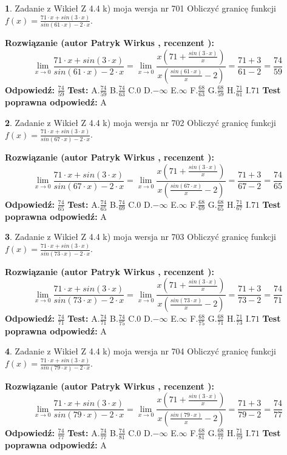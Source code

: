\documentclass[12pt, a4paper]{article}
\theoremstyle{definition} %
\newtheorem{zad}{}
\newcommand{\zadStart}[1]{\begin{zad}#1\newline}
\newcommand{\zadStop}{\end{zad}}
\newcommand{\rozwStart}[2]{\noindent \textbf{Rozwiązanie (autor #1 , recenzent #2): }\newline}
\newcommand{\rozwStop}{\newline}
\newcommand{\odpStart}{\noindent \textbf{Odpowiedź:}\newline}
\newcommand{\odpStop}{\newline}
\newcommand{\testStart}{\noindent \textbf{Test:}\newline}
\newcommand{\testStop}{\newline}
\newcommand{\kluczStart}{\noindent \textbf{Test poprawna odpowiedź:}\newline}
\newcommand{\kluczStop}{\newline}
\begin{document}
\zadStart{Zadanie z Wikieł Z 4.4 k) moja wersja nr 701}
Obliczyć granicę funkcji $f(x)=\frac{71\cdot x +sin(3\cdot x)}{sin(61\cdot x) -2\cdot x}$.
\zadStop
\rozwStart{Patryk Wirkus}{}
$$\lim\limits_{x\to 0}\frac{71\cdot x +sin(3\cdot x)}{sin(61\cdot x) -2\cdot x}
=\lim\limits_{x\to 0}\frac{x(71+\frac{sin(3\cdot x)}{x})}{x(\frac{sin(61\cdot x)}{x}-2)}
=\frac{71+3}{61-2} = \frac{74}{59}$$
\rozwStop
\odpStart
$\frac{74}{59}$
\odpStop
\testStart
A.$\frac{74}{59}$
B.$\frac{74}{63}$
C.$0$
D.$-\infty$
E.$\infty$
F.$\frac{68}{63}$
G.$\frac{68}{59}$
H.$\frac{71}{61}$
I.$71$
\testStop
\kluczStart
A
\kluczStop



\zadStart{Zadanie z Wikieł Z 4.4 k) moja wersja nr 702}
Obliczyć granicę funkcji $f(x)=\frac{71\cdot x +sin(3\cdot x)}{sin(67\cdot x) -2\cdot x}$.
\zadStop
\rozwStart{Patryk Wirkus}{}
$$\lim\limits_{x\to 0}\frac{71\cdot x +sin(3\cdot x)}{sin(67\cdot x) -2\cdot x}
=\lim\limits_{x\to 0}\frac{x(71+\frac{sin(3\cdot x)}{x})}{x(\frac{sin(67\cdot x)}{x}-2)}
=\frac{71+3}{67-2} = \frac{74}{65}$$
\rozwStop
\odpStart
$\frac{74}{65}$
\odpStop
\testStart
A.$\frac{74}{65}$
B.$\frac{74}{69}$
C.$0$
D.$-\infty$
E.$\infty$
F.$\frac{68}{69}$
G.$\frac{68}{65}$
H.$\frac{71}{67}$
I.$71$
\testStop
\kluczStart
A
\kluczStop



\zadStart{Zadanie z Wikieł Z 4.4 k) moja wersja nr 703}
Obliczyć granicę funkcji $f(x)=\frac{71\cdot x +sin(3\cdot x)}{sin(73\cdot x) -2\cdot x}$.
\zadStop
\rozwStart{Patryk Wirkus}{}
$$\lim\limits_{x\to 0}\frac{71\cdot x +sin(3\cdot x)}{sin(73\cdot x) -2\cdot x}
=\lim\limits_{x\to 0}\frac{x(71+\frac{sin(3\cdot x)}{x})}{x(\frac{sin(73\cdot x)}{x}-2)}
=\frac{71+3}{73-2} = \frac{74}{71}$$
\rozwStop
\odpStart
$\frac{74}{71}$
\odpStop
\testStart
A.$\frac{74}{71}$
B.$\frac{74}{75}$
C.$0$
D.$-\infty$
E.$\infty$
F.$\frac{68}{75}$
G.$\frac{68}{71}$
H.$\frac{71}{73}$
I.$71$
\testStop
\kluczStart
A
\kluczStop



\zadStart{Zadanie z Wikieł Z 4.4 k) moja wersja nr 704}
Obliczyć granicę funkcji $f(x)=\frac{71\cdot x +sin(3\cdot x)}{sin(79\cdot x) -2\cdot x}$.
\zadStop
\rozwStart{Patryk Wirkus}{}
$$\lim\limits_{x\to 0}\frac{71\cdot x +sin(3\cdot x)}{sin(79\cdot x) -2\cdot x}
=\lim\limits_{x\to 0}\frac{x(71+\frac{sin(3\cdot x)}{x})}{x(\frac{sin(79\cdot x)}{x}-2)}
=\frac{71+3}{79-2} = \frac{74}{77}$$
\rozwStop
\odpStart
$\frac{74}{77}$
\odpStop
\testStart
A.$\frac{74}{77}$
B.$\frac{74}{81}$
C.$0$
D.$-\infty$
E.$\infty$
F.$\frac{68}{81}$
G.$\frac{68}{77}$
H.$\frac{71}{79}$
I.$71$
\testStop
\kluczStart
A
\kluczStop
\end{document}
